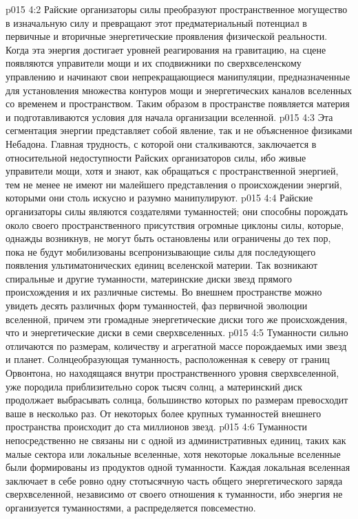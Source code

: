 \vs p015 4:2 Райские организаторы силы преобразуют пространственное могущество в изначальную силу и превращают этот предматериальный потенциал в первичные и вторичные энергетические проявления физической реальности. Когда эта энергия достигает уровней реагирования на гравитацию, на сцене появляются управители мощи и их сподвижники по сверхвселенскому управлению и начинают свои непрекращающиеся манипуляции, предназначенные для установления множества контуров мощи и энергетических каналов вселенных со временем и пространством. Таким образом в пространстве появляется материя и подготавливаются условия для начала организации вселенной.
\vs p015 4:3 Эта сегментация энергии представляет собой явление, так и не объясненное физиками Небадона. Главная трудность, с которой они сталкиваются, заключается в относительной недоступности Райских организаторов силы, ибо живые управители мощи, хотя и знают, как обращаться с пространственной энергией, тем не менее не имеют ни малейшего представления о происхождении энергий, которыми они столь искусно и разумно манипулируют.
\vs p015 4:4 \pc Райские организаторы силы являются создателями туманностей; они способны порождать около своего пространственного присутствия огромные циклоны силы, которые, однажды возникнув, не могут быть остановлены или ограничены до тех пор, пока не будут мобилизованы всепронизывающие силы для последующего появления ультиматонических единиц вселенской материи. Так возникают спиральные и другие туманности, материнские диски звезд прямого происхождения и их различные системы. Во внешнем пространстве можно увидеть десять различных форм туманностей, фаз первичной эволюции вселенной, причем эти громадные энергетические диски того же происхождения, что и энергетические диски в семи сверхвселенных.
\vs p015 4:5 \pc Туманности сильно отличаются по размерам, количеству и агрегатной массе порождаемых ими звезд и планет. Солнцеобразующая туманность, расположенная к северу от границ Орвонтона, но находящаяся внутри пространственного уровня сверхвселенной, уже породила приблизительно сорок тысяч солнц, а материнский диск продолжает выбрасывать солнца, большинство которых по размерам превосходит ваше в несколько раз. От некоторых более крупных туманностей внешнего пространства происходит до ста миллионов звезд.
\vs p015 4:6 Туманности непосредственно не связаны ни с одной из административных единиц, таких как малые сектора или локальные вселенные, хотя некоторые локальные вселенные были формированы из продуктов одной туманности. Каждая локальная вселенная заключает в себе ровно одну стотысячную часть общего энергетического заряда сверхвселенной, независимо от своего отношения к туманности, ибо энергия не организуется туманностями, а распределяется повсеместно.
